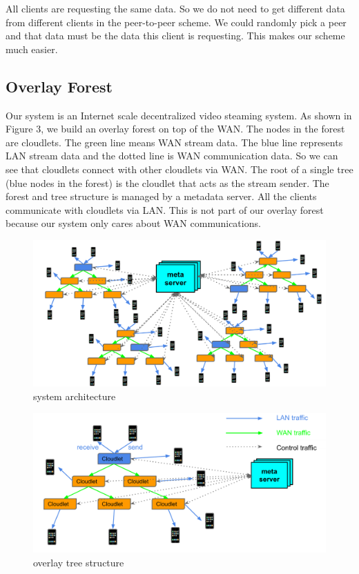 \documentclass[letterpaper,twocolumn,10pt]{article}
\begin{document}
All clients are requesting the same data. So we do not need to get different data from different clients in the peer-to-peer scheme. We could randomly pick a peer and that data must be the data this client is requesting. This makes our scheme much easier.

\subsection{Overlay Forest}

Our system is an Internet scale decentralized video steaming system. As shown in Figure 3, we build an overlay forest on top of the WAN. The nodes in the forest are cloudlets. The green line means WAN stream data. The blue line represents LAN stream data and the dotted line is WAN communication data. So we can see that cloudlets connect with other cloudlets via WAN. The root of a single tree (blue nodes in the forest) is the cloudlet that acts as the stream sender. The forest and tree structure is managed by a metadata server. All the clients communicate with cloudlets via LAN. This is not part of our overlay forest because our system only cares about WAN communications. 

\begin{figure}[t]
\begin{center}
\includegraphics[scale=0.3]{pic/overlay_forest.png}
\end{center}
\caption{system architecture}
\end{figure}

\begin{figure}[h]
\begin{center}
\includegraphics[scale=0.3]{pic/overlay_tree.png}
\end{center}
\caption{overlay tree structure}
\end{figure}
\end{document}
